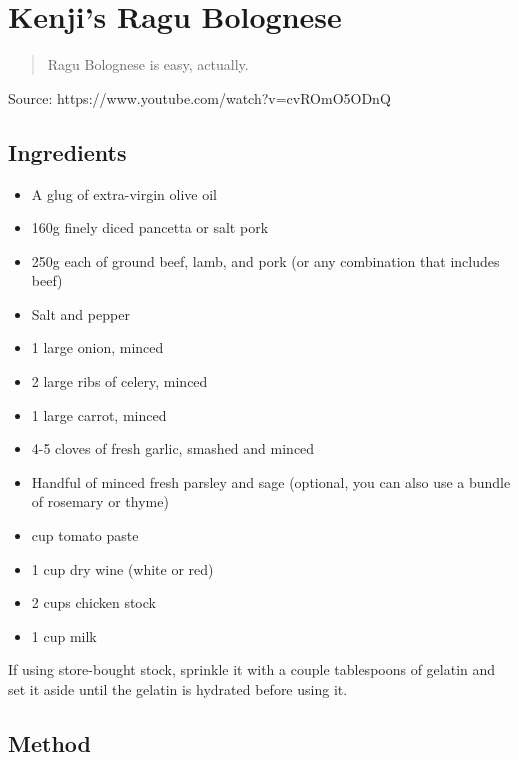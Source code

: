 \section{Kenji's Ragu Bolognese}


\begin{quote}
    Ragu Bolognese is easy, actually.
\end{quote}

Source: https://www.youtube.com/watch?v=cvROmO5ODnQ

\subsection{Ingredients}

\begin{itemize}
    \item A glug of extra-virgin olive oil
    \item 160g finely diced pancetta or salt pork
    \item 250g each of ground beef, lamb, and pork (or any combination that includes beef)
    \item Salt and pepper
    \item 1 large onion, minced
    \item 2 large ribs of celery, minced
    \item 1 large carrot, minced
    \item 4-5 cloves of fresh garlic, smashed and minced
    \item Handful of minced fresh parsley and sage (optional, you can also use a bundle of rosemary or thyme)
    \item {} cup tomato paste
    \item 1 cup dry wine (white or red)
    \item 2 cups chicken stock
    \item 1 cup milk
\end{itemize}
    
If using store-bought stock, sprinkle it with a couple tablespoons of gelatin and set it aside until the gelatin is hydrated before using it.

\subsection{Method}

